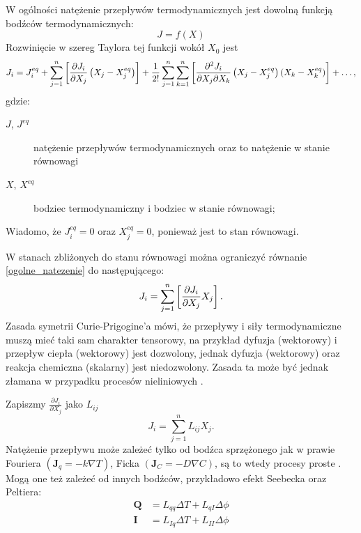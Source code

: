 \documentclass[10pt, a4paper, twoside, onecolumn]{article}
\numberwithin{equation}{section}
\begin{document}
	W ogólności natężenie przepływów termodynamicznych jest dowolną funkcją bodźców termodynamicznych: 
	\[J=f\left(X\right)\]
	Rozwinięcie w szereg Taylora tej funkcji wokół \(X_{0}\) jest
	\begin{equation}\label{ogolne_natezenie}
		J_{i}=J_{i}^{eq}+\sum_{j=1}^{n}\left[\pdv{J_{i}}{X_{j}}\left(X_{j}-X_{j}^{eq}\right)\right]+\frac{1}{2!}\sum_{j=1}^{n}\sum_{k=1}^{n}\left[\pdv{J_{i}}{X_{j}}{X_{k}}\left(X_{j}-X_{j}^{eq}\right)\left(X_{k}-X_{k}^{eq}\right)\right]+\ldots,
	\end{equation}
	gdzie:
	\begin{description}
		\item[\(J\), \(J^{eq}\)] natężenie przepływów termodynamicznych oraz to natężenie w stanie równowagi
		\item[\(X\), \(X^{eq}\)] bodziec termodynamiczny i bodziec w stanie równowagi; 
	\end{description}
	Wiadomo, że \(J_{i}^{eq}=0\) oraz \(X_{j}^{eq}=0\), ponieważ jest to stan równowagi. \par
	W stanach zbliżonych do stanu równowagi można ograniczyć równanie \eqref{ogolne_natezenie} do następującego: 
	\begin{equation}\label{natezenie_liniowe}
		J_{i}=\sum_{j=1}^{n}\left[\pdv{J_{i}}{X_{j}}X_{j}\right].
	\end{equation}
	Zasada symetrii Curie-Prigogine'a mówi, że przepływy i siły termodynamiczne muszą mieć taki sam charakter tensorowy, na przykład dyfuzja (wektorowy) i przepływ ciepła (wektorowy) jest dozwolony, jednak dyfuzja (wektorowy)  oraz reakcja chemiczna (skalarny) jest niedozwolony. Zasada ta może być jednak złamana w przypadku procesów nieliniowych \cite{orlik}. \par
	Zapiszmy \(\frac{\partial J_{i}}{\partial X_{j}}\) jako \(L_{ij}\)
	\begin{equation}
		J_{i}=\sum_{j=1}^{n}L_{ij}X_{j}.
	\end{equation}
	Natężenie przepływu może zależeć tylko od bodźca sprzężonego jak w prawie Fouriera \(\left(\boldsymbol{J}_{q}=-k\nabla T\right)\), Ficka \(\left(\boldsymbol{J}_{C}=-D\nabla C\right)\), są to wtedy procesy proste \cite{orlik}. Mogą one też zależeć od innych bodźców, przykładowo efekt Seebecka oraz Peltiera: \cite{Ceynowa2008}
	\begin{equation}
	\begin{split}
		\boldsymbol{Q} &= L_{qq}\Delta T+L_{qI}\Delta \phi \\
		\boldsymbol{I} &= L_{Iq}\Delta T+L_{II}\Delta \phi
	\end{split}
	\end{equation}
\end{document}
